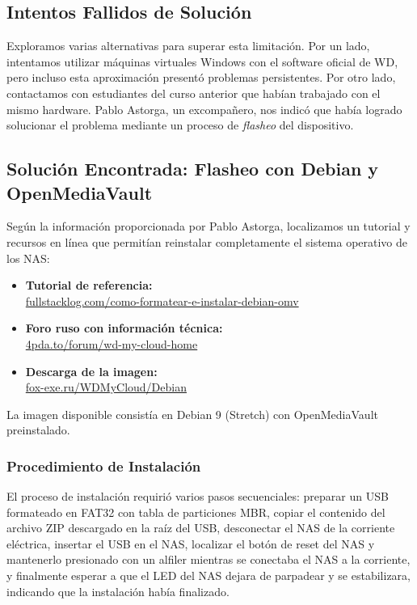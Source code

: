 \documentclass[12pt, a4paper]{article}
\begin{document}
\subsection{Intentos Fallidos de Solución}
Exploramos varias alternativas para superar esta limitación. Por un lado, intentamos utilizar máquinas virtuales Windows con el software oficial de WD, pero incluso esta aproximación presentó problemas persistentes. Por otro lado, contactamos con estudiantes del curso anterior que habían trabajado con el mismo hardware. Pablo Astorga, un excompañero, nos indicó que había logrado solucionar el problema mediante un proceso de \textit{flasheo} del dispositivo.

\subsection{Solución Encontrada: Flasheo con Debian y OpenMediaVault}

Según la información proporcionada por Pablo Astorga, localizamos un tutorial y recursos en línea que permitían reinstalar completamente el sistema operativo de los NAS:

\begin{itemize}
    \item \textbf{Tutorial de referencia:} \\
    \href{https://fullstacklog.com/como-formatear-e-instalar-debian-omv-en-un-nas-wd-my-cloud-home/}{fullstacklog.com/como-formatear-e-instalar-debian-omv}
    \item \textbf{Foro ruso con información técnica:} \\
    \href{https://4pda.to/forum/index.php?showtopic=467828&st=12140#entry87961189}{4pda.to/forum/wd-my-cloud-home}
    \item \textbf{Descarga de la imagen:} \\
    \href{https://fox-exe.ru/WDMyCloud/WDMyCloud-Home/Debian/}{fox-exe.ru/WDMyCloud/Debian}
\end{itemize}

La imagen disponible consistía en Debian 9 (Stretch) con OpenMediaVault preinstalado.

\subsubsection{Procedimiento de Instalación}
El proceso de instalación requirió varios pasos secuenciales: preparar un USB formateado en FAT32 con tabla de particiones MBR, copiar el contenido del archivo ZIP descargado en la raíz del USB, desconectar el NAS de la corriente eléctrica, insertar el USB en el NAS, localizar el botón de reset del NAS y mantenerlo presionado con un alfiler mientras se conectaba el NAS a la corriente, y finalmente esperar a que el LED del NAS dejara de parpadear y se estabilizara, indicando que la instalación había finalizado.
\end{document}
